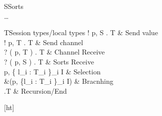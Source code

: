 \begin{table}[ht]
\begin{grammar}{S\Coloneqq}{Sorts}
   \mid {} \mid {} \\
  \dots\\
\end{grammar}
\hfill
\begin{grammar}{T\Coloneqq}{Session types/local types}
  ! \langle p, S \rangle . T & Send value\\
  ! \langle p, T \rangle . T & Send channel\\
  ? ( p, T ) . T & Channel Receive\\
  ? ( p, S ) . T & Sorts Receive\\
  \oplus \langle p, \{ l_i : T_i \}_{i \in I} \rangle & Selection \\
  \&(p, \{l_i : T_i \}_{i \in I}) & Bracnhing \\
  \mu {}.T  \mid {} \mid {} & Recursion/End
\end{grammar}
\caption{Session types/local types} \label{b:mpst:lt}
\end{table}[ht]
